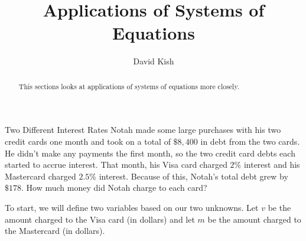 \documentclass[nooutcomes]{ximera}
\author{David Kish}
\title{Applications of Systems of Equations}
\begin{document}
\begin{abstract}
This sections looks at applications of systems of equations more closely.
\end{abstract}
\maketitle
\begin{example}
   Two Different Interest Rates
          Notah made some large purchases with his two credit cards one month and took on a total of
          $\$8{,}400$ in debt from the two cards.
          He didn't make any payments the first month,
          so the two credit card debts each started to accrue interest.
          That month, his Visa card charged $2\%$ interest and his Mastercard charged $2.5\%$ interest.
          Because of this, Notah's total debt grew by $\$178$.
          How much money did Notah charge to each card?\\
\begin{explanation}
          To start, we will define two variables based on our two unknowns.
          Let $v$ be the amount charged to the Visa card
          (in dollars)
          and let $m$ be the amount charged to the Mastercard
          (in dollars).
    

\end{explanation}
\end{example}
\end{document}
